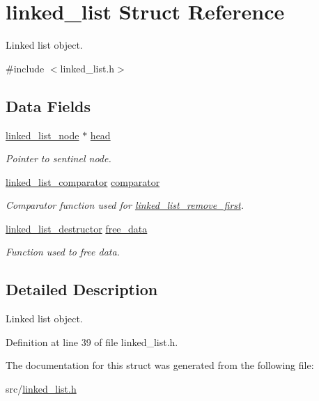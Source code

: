 \hypertarget{structlinked__list}{\section{linked\-\_\-list Struct Reference}
\label{structlinked__list}
}


Linked list object.  




{\ttfamily \#include $<$linked\-\_\-list.\-h$>$}

\subsection*{Data Fields}
\begin{DoxyCompactItemize}
\item 
\hypertarget{structlinked__list_a6046b46c24fb49a689d1db0920845e73}{\hyperlink{structlinked__list__node}{linked\-\_\-list\-\_\-node} $\ast$ \hyperlink{structlinked__list_a6046b46c24fb49a689d1db0920845e73}{head}}\label{structlinked__list_a6046b46c24fb49a689d1db0920845e73}

\begin{DoxyCompactList}\small\item\em Pointer to sentinel node. \end{DoxyCompactList}\item 
\hypertarget{structlinked__list_a89ee1c69d0f3f869f6df7eb2f6476d4f}{\hyperlink{linked__list_8h_a116cfa57c3ae173378b3a3b7a6a92ac7}{linked\-\_\-list\-\_\-comparator} \hyperlink{structlinked__list_a89ee1c69d0f3f869f6df7eb2f6476d4f}{comparator}}\label{structlinked__list_a89ee1c69d0f3f869f6df7eb2f6476d4f}

\begin{DoxyCompactList}\small\item\em Comparator function used for \hyperlink{linked__list_8h_a437c167d15b7b119902e60c68d1c74f9}{linked\-\_\-list\-\_\-remove\-\_\-first}. \end{DoxyCompactList}\item 
\hypertarget{structlinked__list_ac86316b3ba247f327b4ec95b14fac380}{\hyperlink{linked__list_8h_aae34433038e7836e8570c4937ae328b9}{linked\-\_\-list\-\_\-destructor} \hyperlink{structlinked__list_ac86316b3ba247f327b4ec95b14fac380}{free\-\_\-data}}\label{structlinked__list_ac86316b3ba247f327b4ec95b14fac380}

\begin{DoxyCompactList}\small\item\em Function used to free data. \end{DoxyCompactList}\end{DoxyCompactItemize}


\subsection{Detailed Description}
Linked list object. 

Definition at line 39 of file linked\-\_\-list.\-h.



The documentation for this struct was generated from the following file\-:\begin{DoxyCompactItemize}
\item 
src/\hyperlink{linked__list_8h}{linked\-\_\-list.\-h}\end{DoxyCompactItemize}
